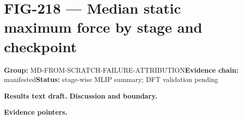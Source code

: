 \clearpage
\section{FIG-218 --- Median static maximum force by stage and checkpoint}
\label{figpage:fig-218}
\textbf{Group:} MD-FROM-SCRATCH-FAILURE-ATTRIBUTION\quad \textbf{Evidence chain:} manifested\quad \textbf{Status:} stage-wise MLIP summary; DFT validation pending

\textbf{Results text draft.} 
\textbf{Discussion and boundary.} 


\textbf{Evidence pointers.}



\vfill
